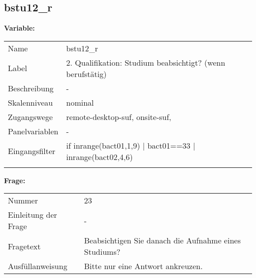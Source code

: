 	
	
	\subsection{bstu12\_r}
	\label{subSection:bstu12_r}

	\noindent\textbf{Variable:}\\
		\begin{tabular}{lL{11.3cm}}
			\label{tableVariable:bstu12_r}
			Name & bstu12\_r \\
			Label & 2. Qualifikation: Studium beabsichtigt? (wenn berufstätig) \\
			Beschreibung & - \\
			Skalenniveau & nominal \\
			Zugangswege &
				remote-desktop-suf,
				onsite-suf,
 \\
			Panelvariablen & -
			 \\
			Eingangsfilter & if inrange(bact01,1,9) | bact01==33 | inrange(bact02,4,6)  \\
 \\
		\end{tabular}

		\vspace*{1 cm}
		\noindent\textbf{Frage:}\\
		\begin{tabular}{lL{11.3cm}}
			\label{tableQuestion:bstu12_r}
			Nummer & 23 \\
			Einleitung der Frage & - \\
			Fragetext & Beabsichtigen Sie danach die Aufnahme eines Studiums? \\
			Ausfüllanweisung & Bitte nur eine Antwort ankreuzen. \\
		\end{tabular}






